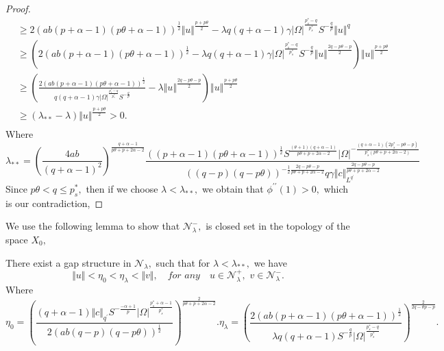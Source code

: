 \documentclass[10pt,twoside,reqno,centertags,draft]{amsart}
\begin{document}
\begin{proof}
\begin{equation}
\begin{aligned}
& \geq  2\left( a b (p+ \alpha -1)(p \theta + \alpha - 1)\right)^{\frac{1}{2}}\Vert u \Vert^{\frac{p+p \theta}{2}}-\lambda q (q + \alpha -1   )  \gamma \vert \Omega \vert^{\frac{p_s^*-q}{p_s^*}}S^{-\frac{q}{p}} \Vert u \Vert^{q}\\
& \geq \left( 2\left( a b (p+ \alpha -1)(p \theta + \alpha - 1)\right)^{\frac{1}{2}} -\lambda q (q + \alpha -1   )  \gamma \vert \Omega \vert^{\frac{p_s^*-q}{p_s^*}}S^{-\frac{q}{p}}\Vert u \Vert^{\frac{2q - p \theta - p}{2}} \right) \Vert u \Vert^{\frac{p+p \theta}{2}}\\
& \geq \left( \frac{2\left(a b (p+ \alpha -1)(p \theta + \alpha - 1)\right)^{\frac{1}{2}}}{q (q + \alpha -1   )  \gamma \vert \Omega \vert^{\frac{p_s^*-q}{p_s^*}}S^{-\frac{q}{p}}}  -\lambda \Vert u \Vert^{\frac{2q - p \theta - p}{2}} \right) \Vert u \Vert^{\frac{p+p \theta}{2}}\\
& \geq \left(\lambda_{**} - \lambda \right)\Vert u \Vert^{\frac{p+p \theta}{2}} > 0.\\
\end{aligned}
\end{equation}
Where 
{\scriptsize
\begin{equation}
\lambda_{**} = \left(\frac{4 ab}{(q + \alpha -1)^2}\right)^{\frac{q +\alpha -1}{p\theta +p +2\alpha -2}}\frac{\left((p+ \alpha -1)(p \theta + \alpha - 1)\right)^{\frac{1}{2}}S^{\frac{(\theta +1)(q +\alpha -1)}{p\theta +p +2\alpha -2}}
\vert \Omega \vert^{-\frac{(q+ \alpha -1)(2p^*_s -p\theta -p)}{p^*_s (p\theta +p +2\alpha -2)}}}{\left((q-p)(q -p\theta)\right)^{-\frac{1}{2}\frac{2q - p \theta - p}{p \theta + p +2\alpha -2 }} q\gamma \Vert c \Vert _{L^{q^{\prime}}}^{\frac{2q - p \theta - p}{p \theta + p +2\alpha -2 }}}
\end{equation}
}
Since $ p\theta < q \leq p^*_s,$ then if we choose $ \lambda < \lambda_{**},$ we obtain that $ \phi^{\prime \prime}(1) > 0,$ which is our contradiction,
\end{proof}
We use the following lemma to show that $ \mathcal{N}^{-}_{\lambda},$  is closed set in the topology of the space $ X_0,$ 
\begin{lemma} \label{l3}
There exist a gap structure in $ \mathcal{N}_{\lambda},$ such that for $ \lambda < \lambda_{**},$ we have
\begin{equation*}
\Vert u \Vert < \eta_{0} < \eta_{\lambda} < \Vert v \Vert, \quad \textit{for any} \quad u \in \mathcal{N}_{\lambda}^{+},\,\, v \in \mathcal{N}_{\lambda}^{-}.
\end{equation*}
Where
{\tiny
\begin{equation*}
\eta_0 = \left( \frac{(q +\alpha -1) \Vert c\Vert_{q^{\prime}} S^{-\frac{-\alpha +1}{p}} \vert \Omega\vert^{\frac{p^*_s  +\alpha -1}{p^*_s}}}{2
\left(ab(q-p)(q-p\theta) \right)^{\frac{1}{2}}} \right)^{\frac{2}{p\theta +p +2\alpha -2}}.  \eta_{\lambda} = \left( \frac{2 \left(ab(p +\alpha -1)(p\theta +\alpha -1)\right)^{\frac{1}{2}}}{\lambda q(q+ \alpha -1) S^{-\frac{q}{p}} \vert \Omega\vert^{\frac{p_s^*-q}{p_s^*}} } \right)^{\frac{2}{2q -\theta p -p}}.
\end{equation*}
}
\end{lemma}
\end{document}
